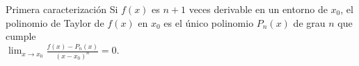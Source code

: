 \begin{frame}{Primera caracterización}
    Si $f(x)$ es $n+1$ veces derivable en un entorno de $x_0$,
    el polinomio de Taylor de $f(x)$ en $x_0$ es el único
    polinomio $P_n(x)$ de grau $n$ que cumple
    \\
    $\lim_{x \rightarrow x_0} \frac{f(x)-P_n(x)}{(x-x_0)^n}=0$.
\end{frame}
